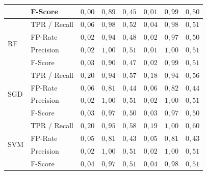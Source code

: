 \begin{table}[h!t]
{\begin{tabular}{|ll|rrr|rrr|}
                     & F-Score      & $0,00$             & $0,89$                 & $0,45$                     & $0,01$             & $0,99$                 & $0,50$                      \\ 
\hline
\multirow{4}{*}{RF}  & TPR / Recall & $0,06$             & $0,98$                 & $0,52$                     & $0,04$             & $0,98$                 & $0,51$                      \\
                     & FP-Rate      & $0,02$             & $0,94$                 & $0,48$                     & $0,02$             & $0,97$                 & $0,50$                      \\
                     & Precision    & $0,02$             & $1,00$                 & $0,51$                     & $0,01$             & $1,00$                 & $0,51$                      \\
                     & F-Score      & $0,03$             & $0,90$                 & $0,47$                     & $0,02$             & $0,99$                 & $0,51$                      \\ 
\hline
\multirow{4}{*}{SGD} & TPR / Recall & $0,20$             & $0,94$                 & $0,57$                     & $0,18$             & $0,94$                 & $0,56$                      \\
                     & FP-Rate      & $0,06$             & $0,81$                 & $0,44$                     & $0,06$             & $0,82$                 & $0,44$                      \\
                     & Precision    & $0,02$             & $1,00$                 & $0,51$                     & $0,02$             & $1,00$                 & $0,51$                      \\
                     & F-Score      & $0,03$             & $0,97$                 & $0,50$                     & $0,03$             & $0,97$                 & $0,50$                      \\ 
\hline
\multirow{4}{*}{SVM} & TPR / Recall & $0,20$             & $0,95$                 & $0,58$                     & $0,19$             & $1,00$                 & $0,60$                      \\
                     & FP-Rate      & $0,05$             & $0,81$                 & $0,43$                     & $0,05$             & $0,81$                 & $0,43$                      \\
                     & Precision    & $0,02$             & $1,00$                 & $0,51$                     & $0,02$             & $1,00$                 & $0,51$                      \\
                     & F-Score      & $0,04$             & $0,97$                 & $0,51$                     & $0,04$             & $0,98$                 & $0,51$                      \\
\hline
\end{tabular}
}
\end{table}

